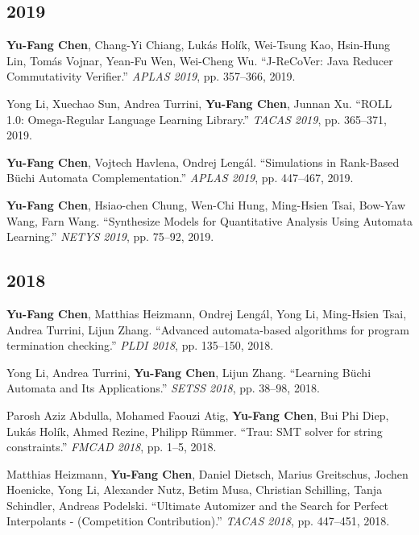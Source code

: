 \documentclass[10.5pt,a4paper]{article}
\begin{document}
\subsection*{2019}
\begin{enumerate}[leftmargin=*,label={[\arabic*]},resume]
\item \textbf{Yu-Fang Chen}, Chang-Yi Chiang, Lukás Holík, Wei-Tsung Kao, Hsin-Hung Lin, Tomás Vojnar, Yean-Fu Wen, Wei-Cheng Wu. ``J-ReCoVer: Java Reducer Commutativity Verifier.'' \emph{APLAS 2019}, pp. 357--366, 2019.
\item Yong Li, Xuechao Sun, Andrea Turrini, \textbf{Yu-Fang Chen}, Junnan Xu. ``ROLL 1.0: Omega-Regular Language Learning Library.'' \emph{TACAS 2019}, pp. 365--371, 2019.
\item \textbf{Yu-Fang Chen}, Vojtech Havlena, Ondrej Lengál. ``Simulations in Rank-Based Büchi Automata Complementation.'' \emph{APLAS 2019}, pp. 447--467, 2019.
\item \textbf{Yu-Fang Chen}, Hsiao-chen Chung, Wen-Chi Hung, Ming-Hsien Tsai, Bow-Yaw Wang, Farn Wang. ``Synthesize Models for Quantitative Analysis Using Automata Learning.'' \emph{NETYS 2019}, pp. 75--92, 2019.
\end{enumerate}
\subsection*{2018}
\begin{enumerate}[leftmargin=*,label={[\arabic*]},resume]
\item \textbf{Yu-Fang Chen}, Matthias Heizmann, Ondrej Lengál, Yong Li, Ming-Hsien Tsai, Andrea Turrini, Lijun Zhang. ``Advanced automata-based algorithms for program termination checking.'' \emph{PLDI 2018}, pp. 135--150, 2018.
\item Yong Li, Andrea Turrini, \textbf{Yu-Fang Chen}, Lijun Zhang. ``Learning Büchi Automata and Its Applications.'' \emph{SETSS 2018}, pp. 38--98, 2018.
\item Parosh Aziz Abdulla, Mohamed Faouzi Atig, \textbf{Yu-Fang Chen}, Bui Phi Diep, Lukás Holík, Ahmed Rezine, Philipp Rümmer. ``Trau: SMT solver for string constraints.'' \emph{FMCAD 2018}, pp. 1--5, 2018.
\item Matthias Heizmann, \textbf{Yu-Fang Chen}, Daniel Dietsch, Marius Greitschus, Jochen Hoenicke, Yong Li, Alexander Nutz, Betim Musa, Christian Schilling, Tanja Schindler, Andreas Podelski. ``Ultimate Automizer and the Search for Perfect Interpolants - (Competition Contribution).'' \emph{TACAS 2018}, pp. 447--451, 2018.
\end{enumerate}
\end{document}
